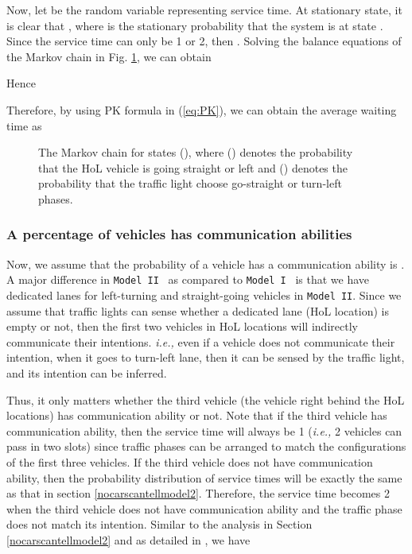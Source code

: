 \documentclass[conference]{IEEEtran}
\newcommand{\ie}{{\em i.e., }}
\newcommand{\modelI}{{\tt{Model I}}}
\newcommand{\modelII}{{\tt{Model II}}}
\begin{document}
Now, let  be the random variable representing service time. At stationary state, it is clear that , where  is the stationary probability that the system is at state . Since the service time can only be 1 or 2, then . Solving the balance equations of the Markov chain in Fig. \ref{fig:markov}, we can obtain

Hence


Therefore, by using PK formula in (\ref{eq:PK}), we can obtain the average waiting time as



\begin{figure} [t!]
\vspace{-15pt}
\centering
{}
\caption{\label{fig:markov} The Markov chain for states  (), where  () denotes the probability that the HoL vehicle is going straight or left and  () denotes the probability that the traffic light choose go-straight or turn-left phases.}
\vspace{-20pt}
\end{figure}

\subsubsection{A percentage of vehicles has communication abilities}\label{somecarcantellmodel2}
Now, we assume that the probability of a vehicle has a communication ability is . A major difference in \modelII~ as compared to \modelI~ is that we have dedicated lanes for left-turning and straight-going vehicles in \modelII. Since we assume that  traffic lights can sense whether a dedicated lane (HoL location) is empty or not, then the first two vehicles in  HoL locations will indirectly communicate their intentions. \ie even if a vehicle does not communicate their intention, when it goes to turn-left lane, then it can be sensed by the traffic light, and its intention can be inferred.

Thus, it only matters whether the third vehicle (the vehicle right behind the HoL locations) has communication ability or not. Note that if the third vehicle has communication ability, then the service time will always be 1 (\ie 2 vehicles can pass in two slots) since traffic phases can be arranged to match the configurations of the first three vehicles. If the third vehicle does not have communication ability, then the probability distribution of service times will be exactly the same as that in section \ref{nocarscantellmodel2}. Therefore, the service time becomes 2 when the third vehicle does not have communication ability and the traffic phase does not match its intention. Similar to the analysis in Section \ref{nocarscantellmodel2} and as detailed in \cite{this_tech}, we have
 
\end{document}
